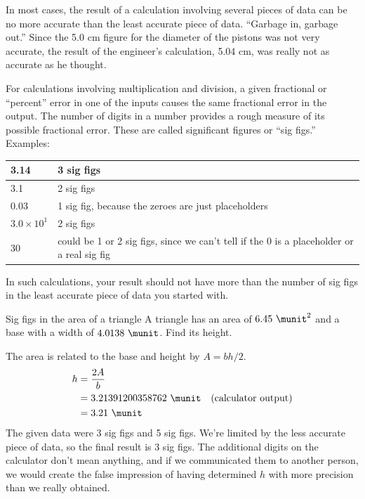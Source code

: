 In most cases, the result
of a calculation involving several pieces of data can be no
more accurate than the least accurate piece of data. 
``Garbage in, garbage out.'' Since the 5.0 cm figure for the
diameter of the pistons was not very accurate, the result of
the engineer's calculation, 5.04 cm, was really not as
accurate as he thought. 

\enlargethispage{-2\baselineskip}

For calculations involving multiplication and division,
a given fractional or ``percent'' error in one of the inputs
causes the same fractional error in the output. The number of
digits in a number provides a rough measure of its possible
fractional error. These are called significant figures
or ``sig figs.'' Examples:

\begin{tabular}{|l|p{80mm}|}
\hline
3.14 & 3 sig figs \\
\hline
3.1  & 2 sig figs \\
\hline
0.03 & 1 sig fig, because the zeroes are just placeholders \\
\hline
$3.0\times10^1$ & 2 sig figs \\
\hline
30   & could be 1 or 2 sig figs, since we can't tell if the 0 is a placeholder or a real sig fig \\
\hline
\end{tabular}

\noindent In such calculations, your result should not
have more than the number of sig figs in the least accurate
piece of data you started with.

\enlargethispage{-2\baselineskip}

\begin{eg}{Sig figs in the area of a triangle}
\egquestion A triangle has an area of $6.45\ \munit^2$ and a base
with a width of $4.0138\ \munit$. Find its height.

\eganswer The area is related to the base and height by
$A=bh/2$.
\begin{align*}
  h &= \frac{2A}{b} \\
    &= 3.21391200358762\ \munit \quad \text{(calculator output)} \\
    &= 3.21\ \munit
\end{align*}
The given data were 3 sig figs and 5 sig figs. We're limited by the
less accurate piece of data, so the final result is 3 sig figs.
The additional digits on the calculator don't mean anything, and
if we communicated them to another person, we would create the false
impression of having determined $h$ with more precision than we really obtained.
\end{eg}

